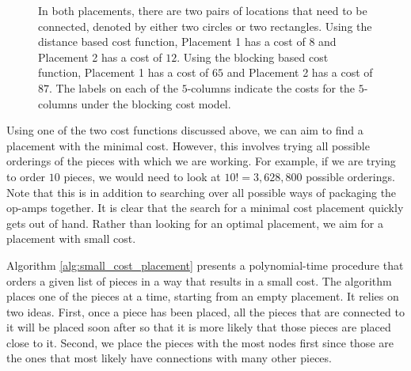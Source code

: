 \begin{figure}[H]
\centering
{}
\caption[Placement cost function examples]{In both placements, there are two
pairs of locations that need to be connected, denoted by either two circles or
two rectangles. Using the distance based cost function, Placement 1 has a cost of
$8$ and Placement 2 has a cost of $12$. Using the blocking based cost function,
Placement 1 has a cost of $65$ and Placement 2 has a cost of $87$. The labels
on each of the $5$-columns indicate the costs for the $5$-columns under the
blocking cost model.}
\label{fig:placement_costs}
\end{figure}

Using one of the two cost functions discussed above, we can aim to find a
placement with the minimal cost. However, this involves trying all possible
orderings of the pieces with which we are working. For example, if we are trying
to order $10$ pieces, we would need to look at $10! = 3,628,800$ possible
orderings. Note that this is in addition to
searching over all possible ways
of packaging the op-amps together. It is clear that the search for a
minimal cost placement quickly gets out of hand.
Rather than looking for an optimal placement, we aim for a placement with small
cost.

Algorithm \ref{alg:small_cost_placement} presents a polynomial-time procedure
that orders a
given list of pieces in a way that results in a small cost. The algorithm places
one of the pieces at a time, starting from an empty placement. It relies
on two ideas. First, once a piece has been placed, all the pieces that are
connected to it will be placed soon after so that it is more likely that those
pieces are placed close to it. Second, we place the pieces with the most nodes
first since those are the ones that most likely have connections with many other
pieces.

